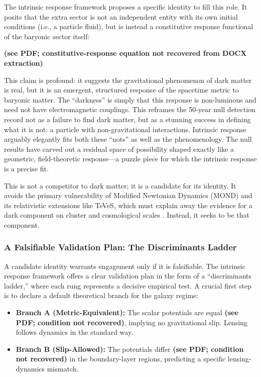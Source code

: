 The intrinsic response framework proposes a specific identity to fill this role. It posits that the extra sector is not an independent entity with its own initial conditions (i.e., a particle fluid), but is instead a constitutive response functional of the baryonic sector itself:

\textbf{(see PDF; constitutive-response equation not recovered from DOCX extraction)}

This claim is profound: it suggests the gravitational phenomenon of dark matter is real, but it is an emergent, structured response of the spacetime metric to baryonic matter. The ``darkness'' is simply that this response is non-luminous and need not have electromagnetic couplings. This reframes the 50-year null detection record not as a failure to find dark matter, but as a stunning success in defining what it is not: a particle with non-gravitational interactions. Intrinsic response arguably elegantly fits both these ``nots'' as well as the phenomenology. The null results have carved out a residual space of possibility shaped exactly like a geometric, field-theoretic response---a puzzle piece for which the intrinsic response is a precise fit.

This is not a competitor to dark matter; it is a candidate for its identity. It avoids the primary vulnerability of Modified Newtonian Dynamics (MOND) and its relativistic extensions like TeVeS, which must explain away the evidence for a dark component on cluster and cosmological scales \citep{Milgrom1983,Bekenstein2004}. Instead, it seeks to be that component.

\subsubsection{A Falsifiable Validation Plan: The Discriminants Ladder}

A candidate identity warrants engagement only if it is falsifiable. The intrinsic response framework offers a clear validation plan in the form of a ``discriminants ladder,'' where each rung represents a decisive empirical test. A crucial first step is to declare a default theoretical branch for the galaxy regime:
\begin{itemize}
	\item \textbf{Branch A (Metric-Equivalent):} The scalar potentials are equal \textbf{(see PDF; condition not recovered)}, implying no gravitational slip. Lensing follows dynamics in the standard way.
	\item \textbf{Branch B (Slip-Allowed):} The potentials differ \textbf{(see PDF; condition not recovered)} in the boundary-layer regions, predicting a specific lensing-dynamics mismatch.
\end{itemize}


